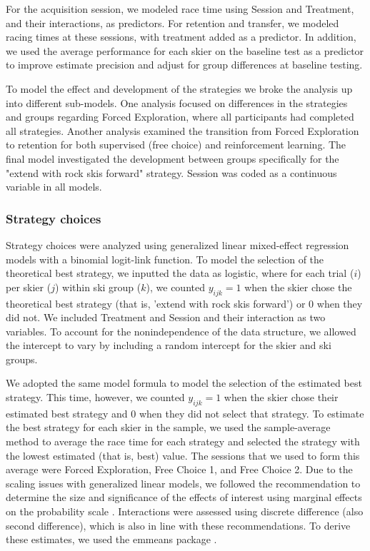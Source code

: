 \documentclass[pdflatex,sn-mathphys-num]{sn-jnl}%
\theoremstyle{thmstyleone}%
\theoremstyle{thmstyletwo}%
\theoremstyle{thmstylethree}%
\begin{document}
For the acquisition session, we modeled race time using Session and Treatment, and their interactions, as predictors. For retention and transfer, we modeled racing times at these sessions, with treatment added as a predictor. In addition, we used the average performance for each skier on the baseline test as a predictor to improve estimate precision and adjust for group differences at baseline testing. 

To model the effect and development of the strategies we broke the analysis up into different sub-models. One analysis focused on differences in the strategies and groups regarding Forced Exploration, where all participants had completed all strategies. Another analysis examined the transition from Forced Exploration to retention for both supervised (free choice) and reinforcement learning. The final model investigated the development between groups specifically for the "extend with rock skis forward" strategy. Session was coded as a continuous variable in all models. 


\subsubsection{Strategy choices}

Strategy choices were analyzed using generalized linear mixed-effect regression models with a binomial logit-link function. To model the selection of the theoretical best strategy, we inputted the data as logistic, where for each trial (\(i\)) per skier (\(j\)) within ski group (\(k\)), we counted \(y_{ijk}=1\) when the skier chose the theoretical best strategy (that is, 'extend with rock skis forward') or 0 when they did not. We included Treatment and Session and their interaction as two variables. To account for the nonindependence of the data structure, we allowed the intercept to vary by including a random intercept for the skier and ski groups.

We adopted the same model formula to model the selection of the estimated best strategy. This time, however, we counted \(y_{ijk}=1\) when the skier chose their estimated best strategy and 0 when they did not select that strategy. To estimate the best strategy for each skier in the sample, we used the sample-average method \cite{sutton_reinforcement_2018} to average the race time for each strategy and selected the strategy with the lowest estimated (that is, best) value. The sessions that we used to form this average were Forced Exploration, Free Choice 1, and Free Choice 2.  Due to the scaling issues with generalized linear models, we followed the recommendation to determine the size and significance of the effects of interest using marginal effects on the probability scale \cite{mize_best_2019, mccabe_interpreting_2022}. Interactions were assessed using discrete difference (also second difference), which is also in line with these recommendations. To derive these estimates, we used the emmeans package \cite{lenth_emmeans_2023}.
\end{document}
